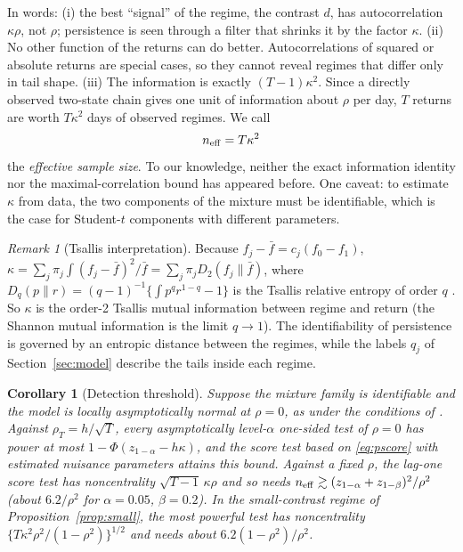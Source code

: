 \documentclass[12pt,letterpaper]{article}
\theoremstyle{plain}
\newtheorem{corollary}{Corollary}
\theoremstyle{remark}
\newtheorem{remark}{Remark}
\begin{document}
In words: (i) the best ``signal'' of the regime, the contrast $d$, has autocorrelation $\kappa\rho$, not $\rho$; persistence is seen through a filter that shrinks it by the factor $\kappa$. (ii) No other function of the returns can do better. Autocorrelations of squared or absolute returns are special cases, so they cannot reveal regimes that differ only in tail shape. (iii) The information is exactly $(T-1)\kappa^2$. Since a directly observed two-state chain gives one unit of information about $\rho$ per day, $T$ returns are worth $T\kappa^2$ days of observed regimes. We call
\[
n_{\rm eff}=T\kappa^2
\]
the \emph{effective sample size}. To our knowledge, neither the exact information identity nor the maximal-correlation bound has appeared before. One caveat: to estimate $\kappa$ from data, the two components of the mixture must be identifiable, which is the case for Student-$t$ components with different parameters.

\begin{remark}[Tsallis interpretation]\label{rem:tsallis}
Because $f_j-\bar f=c_j(f_0-f_1)$, $\kappa=\sum_j\pi_j\int(f_j-\bar f)^2/\bar f=\sum_j\pi_jD_2(f_j\|\bar f)$, where $D_q(p\|r)=(q-1)^{-1}\{\int p^qr^{1-q}-1\}$ is the Tsallis relative entropy of order $q$ \citep{tsallis2009}. So $\kappa$ is the order-2 Tsallis mutual information between regime and return (the Shannon mutual information is the limit $q\to1$). The identifiability of persistence is governed by an entropic distance between the regimes, while the labels $q_j$ of Section~\ref{sec:model} describe the tails inside each regime.
\end{remark}

\begin{corollary}[Detection threshold]\label{cor:detect}
Suppose the mixture family is identifiable and the model is locally asymptotically normal at $\rho=0$, as under the conditions of \citet{bickel1998}. Against $\rho_T=h/\sqrt T$, every asymptotically level-$\alpha$ one-sided test of $\rho=0$ has power at most $1-\Phi(z_{1-\alpha}-h\kappa)$, and the score test based on \eqref{eq:pscore} with estimated nuisance parameters attains this bound. Against a fixed $\rho$, the lag-one score test has noncentrality $\sqrt{T-1}\,\kappa\rho$ and so needs $n_{\rm eff}\gtrsim(z_{1-\alpha}+z_{1-\beta})^2/\rho^2$ (about $6.2/\rho^2$ for $\alpha=0.05$, $\beta=0.2$). In the small-contrast regime of Proposition~\ref{prop:small}, the most powerful test has noncentrality $\{T\kappa^2\rho^2/(1-\rho^2)\}^{1/2}$ and needs about $6.2(1-\rho^2)/\rho^2$.
\end{corollary}
\end{document}
